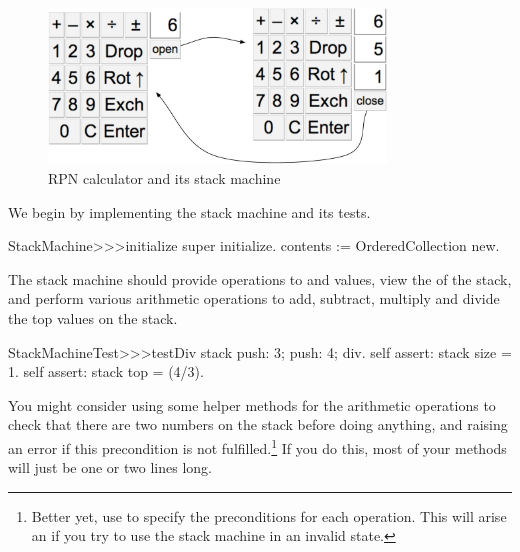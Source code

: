 \documentclass[a4paper,10pt,twoside]{book}
\begin{document}
\begin{figure}[ht]
\begin{center}
\includegraphics[width=0.8\textwidth]{stackMachine}
\caption{RPN calculator and its stack machine}
\label{fig:stackMachine}
\end{center}
\end{figure}

We begin by implementing the stack machine and its tests.


\begin{code}{}
StackMachine>>>initialize
	super initialize.
	contents := OrderedCollection new.
\end{code}

The stack machine should provide operations to  and  values, view the  of the stack, and perform various arithmetic operations to add, subtract, multiply and divide the top values on the stack.


\begin{code}{}
StackMachineTest>>>testDiv
	stack
		push: 3;
		push: 4;
		div.
	self assert: stack size = 1.
	self assert: stack top = (4/3).
\end{code}

You might consider using some helper methods for the arithmetic operations to check that there are two numbers on the stack before doing anything, and raising an error if this precondition is not fulfilled.\footnote{Better yet, use  to specify the preconditions for each operation.
This will arise an  if you try to use the stack machine in an invalid state.}
If you do this, most  of your methods will just be one or two lines long.
\end{document}
